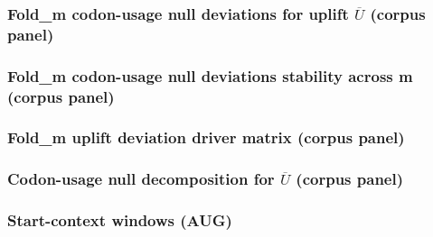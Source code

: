 \subsubsection{Fold\_m codon-usage null deviations for uplift \texorpdfstring{$\overline{U}$}{Ubar} (corpus panel)}
\noindent
\medskip
\noindent

\subsubsection{Fold\_m codon-usage null deviations stability across m (corpus panel)}
\noindent
\medskip
\noindent

\subsubsection{Fold\_m uplift deviation driver matrix (corpus panel)}
\noindent
\medskip
\noindent

\subsubsection{Codon-usage null decomposition for \texorpdfstring{$\overline{U}$}{Ubar} (corpus panel)}
\noindent
\medskip
\noindent

\subsubsection{Start-context windows (AUG)}
\begin{center}
\scriptsize
\setlength{\tabcolsep}{3pt}
\renewcommand{\arraystretch}{1.10}
\end{center}

